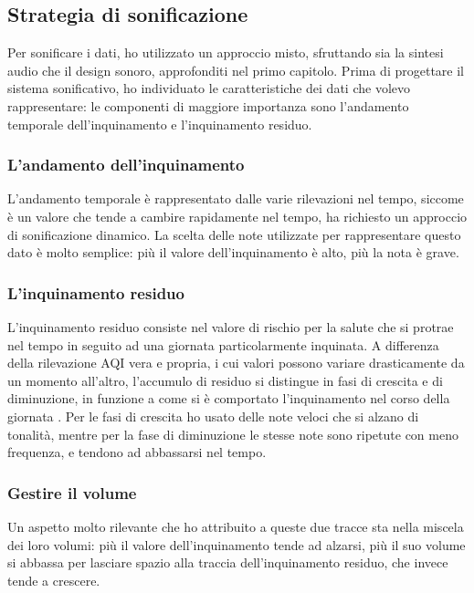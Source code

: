 \subsection{Strategia di sonificazione}
Per sonificare i dati, ho utilizzato un approccio misto, sfruttando sia la sintesi audio che il design sonoro, approfonditi nel primo capitolo.
Prima di progettare il sistema sonificativo, ho individuato le caratteristiche dei dati che volevo rappresentare:
le componenti di maggiore importanza sono l’andamento temporale dell'inquinamento e l'inquinamento residuo.
\subsubsection{L'andamento dell'inquinamento}
L'andamento temporale è rappresentato dalle varie rilevazioni nel tempo, siccome è un valore che tende a cambire rapidamente nel tempo, ha richiesto un approccio di sonificazione dinamico.
La scelta delle note utilizzate per rappresentare questo dato è molto semplice: più il valore dell'inquinamento è alto, più la nota è grave.
\subsubsection{L'inquinamento residuo}
L'inquinamento residuo consiste nel valore di rischio per la salute che si protrae nel tempo in seguito ad una giornata particolarmente inquinata.
A differenza della rilevazione AQI vera e propria, i cui valori possono variare drasticamente da un momento all'altro, l'accumulo di residuo si distingue in fasi di crescita e di diminuzione, in funzione a come si è comportato l'inquinamento nel corso della giornata \cite{residue}.
Per le fasi di crescita ho usato delle note veloci che si alzano di tonalità, mentre per la fase di diminuzione le stesse note sono ripetute con meno frequenza, e tendono ad abbassarsi nel tempo.
\subsubsection{Gestire il volume}
Un aspetto molto rilevante che ho attribuito a queste due tracce sta nella miscela dei loro volumi: più il valore dell'inquinamento tende ad alzarsi, più il suo volume si abbassa per lasciare spazio alla traccia dell'inquinamento residuo, che invece tende a crescere.
